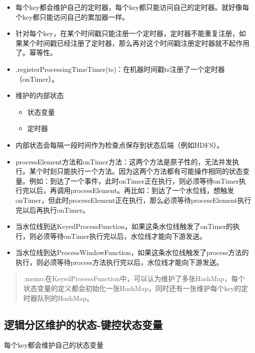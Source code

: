 \begin{itemize}
\tightlist
\item
  每个key都会维护自己的定时器，每个key都只能访问自己的定时器。就好像每个key都只能访问自己的累加器一样。
\item
  针对每个key，在某个时间戳只能注册一个定时器，定时器不能重复注册，如果某个时间戳已经注册了定时器，那么再对这个时间戳注册定时器就不起作用了。幂等性。
\item
  .registerProcessingTimeTimer(ts)：在机器时间戳ts注册了一个定时器（onTimer）。
\item
  维护的内部状态

  \begin{itemize}
  \tightlist
  \item
    状态变量
  \item
    定时器
  \end{itemize}
\item
  内部状态会每隔一段时间作为检查点保存到状态后端（例如HDFS）。
\item
  processElement方法和onTimer方法：这两个方法是{原子性}的，无法并发执行。某个时刻只能执行一个方法。因为这两个方法都有可能操作相同的状态变量。例如：到达了一个事件，此时onTimer正在执行，则必须等待onTimer执行完以后，再调用processElement。再比如：到达了一个水位线，想触发onTimer，但此时processElement正在执行，那么必须等待processElement执行完以后再执行onTimer。
\item
  当水位线到达KeyedProcessFunction，如果这条水位线触发了onTimer的执行，则必须等待onTimer执行完以后，水位线才能向下游发送。
\item
  当水位线到达ProcessWindowFunction，如果这条水位线触发了process方法的执行，则必须等待process方法执行完以后，水位线才能向下游发送。
\end{itemize}

\begin{quote}
:memo:在KeyedProcessFunction中，可以认为维护了多张HashMap，每个状态变量的定义都会初始化一张HashMap，同时还有一张维护每个key的定时器队列的HashMap。
\end{quote}

\hypertarget{ux903bux8f91ux5206ux533aux7ef4ux62a4ux7684ux72b6ux6001-ux952eux63a7ux72b6ux6001ux53d8ux91cf}{%
\subsection{逻辑分区维护的状态-键控状态变量}\label{ux903bux8f91ux5206ux533aux7ef4ux62a4ux7684ux72b6ux6001-ux952eux63a7ux72b6ux6001ux53d8ux91cf}}

每个key都会维护自己的状态变量

